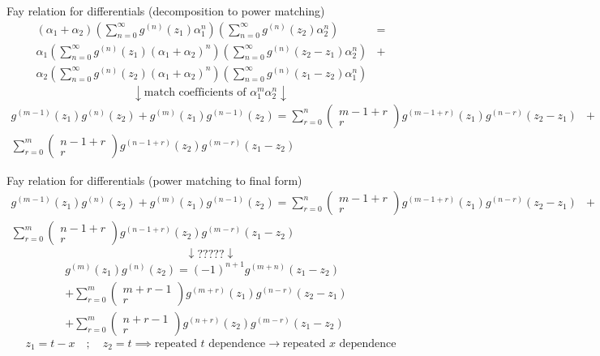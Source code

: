 \documentclass[11pt,aspectratio=169]{beamer}
\begin{document}
\begin{frame}{Fay relation for differentials (decomposition to power matching)}
    \begin{align*}
        (\alpha_1+\alpha_2)\left(\sum_{n=0}^\infty g^{(n)}(z_1) \alpha_1^n\right)\left(\sum_{n=0}^\infty g^{(n)}(z_2) \alpha_2^n\right)& = \\
        \alpha_1\left(\sum_{n=0}^\infty g^{(n)}(z_1) (\alpha_1+\alpha_2)^n\right)\left(\sum_{n=0}^\infty g^{(n)}(z_2-z_1) \alpha_2^n\right)& + \\
        \alpha_2\left(\sum_{n=0}^\infty g^{(n)}(z_2) (\alpha_1+\alpha_2)^n\right)\left(\sum_{n=0}^\infty g^{(n)}(z_1-z_2) \alpha_1^n\right)&
    \end{align*}
    \[\downarrow \text{match coefficients of }\alpha_1^m \alpha_2^n \downarrow\]
    \begin{align*}
        g^{(m-1)}(z_1) g^{(n)}(z_2) + g^{(m)}(z_1) g^{(n-1)}(z_2) = \sum_{r=0}^n \begin{pmatrix} m-1+r \\ r \end{pmatrix} g^{(m-1+r)}(z_1) g^{(n-r)}(z_2-z_1)& + \\
        \sum_{r=0}^m \begin{pmatrix} n-1+r \\ r \end{pmatrix} g^{(n-1+r)}(z_2) g^{(m-r)}(z_1-z_2)&
    \end{align*}
\end{frame}

\begin{frame}{Fay relation for differentials (power matching to final form)}
    \begin{align*}
        g^{(m-1)}(z_1) g^{(n)}(z_2) + g^{(m)}(z_1) g^{(n-1)}(z_2) = \sum_{r=0}^n \begin{pmatrix} m-1+r \\ r \end{pmatrix} g^{(m-1+r)}(z_1) g^{(n-r)}(z_2-z_1)& + \\
        \sum_{r=0}^m \begin{pmatrix} n-1+r \\ r \end{pmatrix} g^{(n-1+r)}(z_2) g^{(m-r)}(z_1-z_2)&
    \end{align*}
    \[\downarrow ????? \downarrow\]
    \begin{align*}
        g^{(m)}(z_1) g^{(n)}(z_2) = (-1)^{n+1} g^{(m+n)}(z_1-z_2)& \\
         +\sum_{r=0}^m \begin{pmatrix} m+r-1 \\ r \end{pmatrix} g^{(m+r)}(z_1) g^{(n-r)}(z_2-z_1) & \\
         +\sum_{r=0}^m \begin{pmatrix} n+r-1 \\ r \end{pmatrix} g^{(n+r)}(z_2) g^{(m-r)}(z_1-z_2) & 
    \end{align*}
    \[z_1 = t-x \quad ; \quad z_2 = t \implies \text{repeated }t\text{ dependence} \rightarrow \text{repeated }x\text{ dependence}\]
\end{frame}
\end{document}
